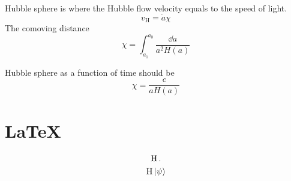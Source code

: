 Hubble sphere is where the Hubble flow velocity equals to the speed of light. 
\begin{equation}
    v_{\mathrm{H}} = \dot{a} \chi  
\end{equation}
The comoving distance 
\begin{equation}
    \chi = \int_{a_1}^{a_0} \frac{\dd a}{a^2 H(a)}
\end{equation}

Hubble sphere as a function of time should be 
\begin{equation}
    \chi =\frac{c}{a H(a)}
\end{equation}

\section*{\LaTeX}


\begin{gather}
    \operatorname{H}.\\
    \operatorname{H} \ket{\psi}
\end{gather}




